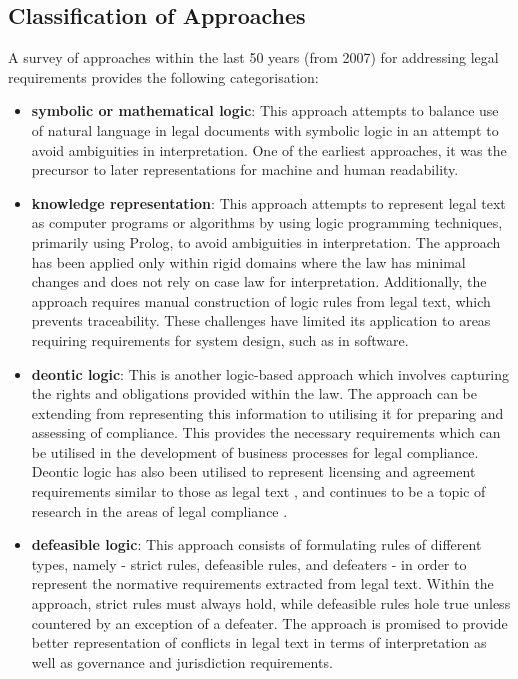 \subsection{Classification of Approaches}
A survey of approaches within the last 50 years (from 2007) for addressing legal requirements \cite{otto_addressing_2007} provides the following categorisation:
\begin{itemize}
    \item \textbf{symbolic or mathematical logic}:  This approach attempts to balance use of natural language in legal documents with symbolic logic in an attempt to avoid ambiguities in interpretation. One of the earliest approaches, it was the precursor to later representations for machine and human readability.
    \item \textbf{knowledge representation}: This approach attempts to represent legal text as computer programs or algorithms by using logic programming techniques, primarily using Prolog, to avoid ambiguities in interpretation. The approach has been applied only within rigid domains where the law has minimal changes and does not rely on case law for interpretation. Additionally, the approach requires manual construction of logic rules from legal text, which prevents traceability. These challenges have limited its application to areas requiring requirements for system design, such as in software.
	\item \textbf{deontic logic}: This is another logic-based approach which involves capturing the rights and obligations provided within the law. The approach can be extending from representing this information to utilising it for preparing and assessing of compliance. This provides the necessary requirements which can be utilised in the development of business processes for legal compliance. Deontic logic has also been utilised to represent licensing and agreement requirements similar to those as legal text \cite{pellegrini_genealogy_2018}, and continues to be a topic of research in the areas of legal compliance \cite{palmirani_pronto:_2018,agarwal_legislative_2018,vos_odrl_2019}.
	\item \textbf{defeasible logic}: This approach consists of formulating rules of different types, namely - strict rules, defeasible rules, and defeaters - in order to represent the normative requirements extracted from legal text. Within the approach, strict rules must always hold, while defeasible rules hole true unless countered by an exception of a defeater. The approach is promised to provide better representation of conflicts in legal text in terms of interpretation as well as governance and jurisdiction requirements.

\end{itemize}
